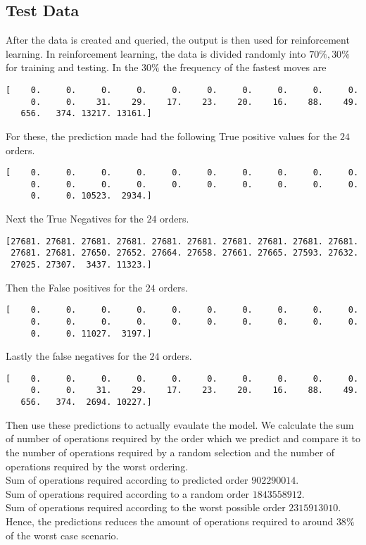 \subsection{Test Data}
After the data is created and queried, the output is then used for reinforcement learning. In reinforcement learning, the data is divided randomly into $70\%,30\%$ for training and testing. In the $30\%$ the frequency of the fastest moves are
\begin{lstlisting}
[    0.     0.     0.     0.     0.     0.     0.     0.     0.     0.
     0.     0.    31.    29.    17.    23.    20.    16.    88.    49.
   656.   374. 13217. 13161.]
\end{lstlisting}
For these, the prediction made had the following True positive values for the $24$ orders.
\begin{lstlisting}
[    0.     0.     0.     0.     0.     0.     0.     0.     0.     0.
     0.     0.     0.     0.     0.     0.     0.     0.     0.     0.
     0.     0. 10523.  2934.]
\end{lstlisting}
Next the True Negatives for the $24$ orders.
\begin{lstlisting}
[27681. 27681. 27681. 27681. 27681. 27681. 27681. 27681. 27681. 27681.
 27681. 27681. 27650. 27652. 27664. 27658. 27661. 27665. 27593. 27632.
 27025. 27307.  3437. 11323.]
\end{lstlisting}
Then the False positives for the $24$ orders.
\begin{lstlisting}
[    0.     0.     0.     0.     0.     0.     0.     0.     0.     0.
     0.     0.     0.     0.     0.     0.     0.     0.     0.     0.
     0.     0. 11027.  3197.]
\end{lstlisting}
Lastly the false negatives for the $24$ orders.
\begin{lstlisting}
[    0.     0.     0.     0.     0.     0.     0.     0.     0.     0.
     0.     0.    31.    29.    17.    23.    20.    16.    88.    49.
   656.   374.  2694. 10227.]
\end{lstlisting}
Then use these predictions to actually evaulate the model. We calculate the sum of number of operations required by the order which we predict and compare it to the number of operations required by a random selection and the number of operations required by the worst ordering.\\
Sum of operations required according to predicted order $902290014$.\\
Sum of operations required according to a random order  $1843558912$.\\
Sum of operations required according to the worst possible order $2315913010$.\\
Hence, the predictions reduces the amount of operations required to around $38\%$ of the worst case scenario.
